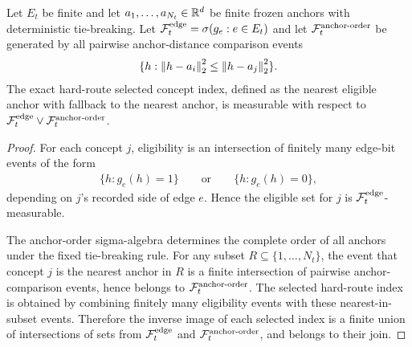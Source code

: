 \begin{theorem}
\label{thm:hard-dgm-measurable:formal}
Let $E_t$ be finite and let $a_1,\ldots,a_{N_t}\in\mathbb{R}^d$ be finite frozen anchors with deterministic tie-breaking. Let $\mathcal{F}_t^{\mathrm{edge}}=\sigma(g_e:e\in E_t)$ and let $\mathcal{F}_t^{\mathrm{anchor\text{-}order}}$ be generated by all pairwise anchor-distance comparison events
\begin{align*}
\{h:\left\lVert h-a_i\right\rVert_2^2\le\left\lVert h-a_j\right\rVert_2^2\}.
\end{align*}
The exact hard-route selected concept index, defined as the nearest eligible anchor with fallback to the nearest anchor, is measurable with respect to $\mathcal{F}_t^{\mathrm{edge}}\vee\mathcal{F}_t^{\mathrm{anchor\text{-}order}}$.
\end{theorem}
\begin{proof}
For each concept $j$, eligibility is an intersection of finitely many edge-bit events of the form
\begin{align*}
\{h:g_e(h)=1\}
\qquad\text{or}\qquad
\{h:g_e(h)=0\},
\end{align*}
depending on $j$'s recorded side of edge $e$. Hence the eligible set for $j$ is $\mathcal{F}_t^{\mathrm{edge}}$-measurable.

The anchor-order sigma-algebra determines the complete order of all anchors under the fixed tie-breaking rule. For any subset $R\subseteq\{1,\ldots,N_t\}$, the event that concept $j$ is the nearest anchor in $R$ is a finite intersection of pairwise anchor-comparison events, hence belongs to $\mathcal{F}_t^{\mathrm{anchor\text{-}order}}$. The selected hard-route index is obtained by combining finitely many eligibility events with these nearest-in-subset events. Therefore the inverse image of each selected index is a finite union of intersections of sets from $\mathcal{F}_t^{\mathrm{edge}}$ and $\mathcal{F}_t^{\mathrm{anchor\text{-}order}}$, and belongs to their join.
\end{proof}

